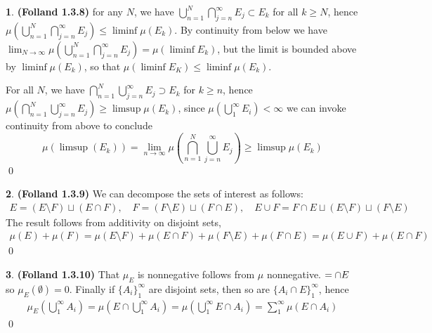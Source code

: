 \documentclass[10.5pt]{article}
\theoremstyle{definition}
\newtheorem{pb}{}
\newcommand{\set}[1]{\{#1\}}
\begin{document}
    \begin{pb}\textbf{(Folland 1.3.8)}
        for any \(N\), we have \(\bigcup_{n=1}^N \bigcap_{j=n}^\infty E_j \subset E_k\) for all \(k \geq N\), hence \(\mu(\bigcup_{n=1}^N \bigcap_{j=n}^\infty E_j) \leq \liminf \mu(E_k)\). By continuity from below we have \(\lim_{N\to\infty}\mu(\bigcup_{n=1}^N \bigcap_{j=n}^\infty E_j) = \mu(\liminf E_k)\), but the limit is bounded above by \(\liminf \mu(E_k)\), so that \(\mu(\liminf E_K) \leq \liminf\mu(E_k)\).
        
        For all \(N\), we have \(\bigcap_{n=1}^N\bigcup_{j=n}^\infty E_j \supset E_k\) for \(k \geq n\), hence \(\mu(\bigcap_{n=1}^N\bigcup_{j=n}^\infty E_j) \geq \limsup \mu(E_k)\), since \(\mu(\bigcup_1^\infty E_i) < \infty\) we can invoke continuity from above to conclude \[\mu(\limsup(E_k)) = \lim_{n\to\infty}\mu(\bigcap_{n=1}^N\bigcup_{j=n}^\infty E_j) \geq \limsup \mu(E_k)\] \qed
    \end{pb}
    \begin{pb}\textbf{(Folland 1.3.9)}
        We can decompose the sets of interest as follows:
        \begin{align*}
            E = (E \setminus F) \sqcup (E \cap F), \quad F = (F \setminus E) \sqcup (F \cap E), \quad E \cup F = F \cap E \sqcup (E \setminus F) \sqcup (F \setminus E)
        \end{align*}
        The result follows from additivity on disjoint sets,
        \begin{align*}
            \mu(E) + \mu(F) = \mu(E \setminus F) + \mu(E \cap F) + \mu(F \setminus E) + \mu(F \cap E) = \mu(E \cup F) + \mu(E \cap F)
        \end{align*} \qed
    \end{pb}
    \begin{pb}\textbf{(Folland 1.3.10)}
        That \(\mu_E\) is nonnegative follows from \(\mu\) nonnegative. \(\empty = \empty \cap E\) so \(\mu_E(\emptyset) = 0\). Finally if \(\set{A_i}_1^\infty\) are disjoint sets, then so are \(\set{A_i\cap E}_1^\infty\), hence
        \begin{align*}
            \mu_E(\bigcup_1^\infty A_i) = \mu(E \cap \bigcup_1^\infty A_i) = \mu(\bigcup_1^\infty E \cap A_i) = \sum_1^\infty \mu(E\cap A_i)
        \end{align*} \qed
    \end{pb}
\end{document}
